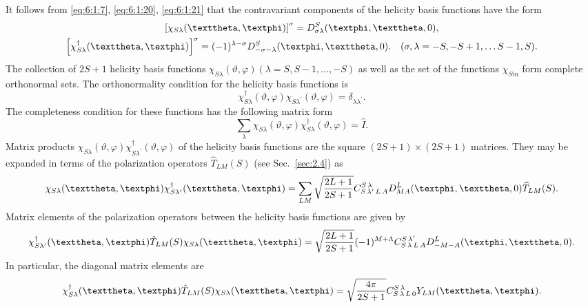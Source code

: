 It follows from \eqref{eq:6:1:7}, \eqref{eq:6:1:20}, \eqref{eq:6:1:21} that the contravariant components of the helicity basis functions have the form
\begin{gather}
{\left[\chi_{S \lambda}(\vartheta, \varphi)\right]^{\sigma}=D_{\sigma \lambda}^{S}(\varphi, \vartheta, 0)}, \notag\\
{\left[\chi_{S \lambda}^{\dagger}(\vartheta, \varphi)\right]^{\sigma}=(-1)^{\lambda-\sigma} D_{-\sigma-\lambda}^{S}(\varphi, \vartheta, 0) . \quad(\sigma, \lambda=-S,-S+1, \ldots S-1, S)}. \label{eq:6:1:22}
\end{gather}
The collection of $2 S+1$ helicity basis functions $\chi_{S \lambda}(\vartheta, \varphi)(\lambda=S, S-1, \ldots,-S)$ as well as the set of the functions $\chi_{S m}$ form complete orthonormal sets. The orthonormality condition for the helicity basis functions is
\begin{equation}
\chi_{S \lambda}^{\dagger}(\vartheta, \varphi) \chi_{S \lambda^{\prime}}(\vartheta, \varphi)=\delta_{\lambda \lambda^{\prime}}. \label{eq:6:1:23}
\end{equation}
The completeness condition for these functions has the following matrix form
\begin{equation}
\sum_{\lambda} \chi_{S \lambda}(\vartheta, \varphi) \chi_{S \lambda}^{\dagger}(\vartheta, \varphi)=\hat{I} . \label{eq:6:1:24}
\end{equation}
Matrix products $\chi_{S \lambda}(\vartheta, \varphi) \chi_{S \lambda^{\prime}}^{\dagger}(\vartheta, \varphi)$ of the helicity basis functions are the square $(2 S+1) \times(2 S+1)$ matrices. They may be expanded in terms of the polarization operators $\widehat{T}_{L M}(S)$ (see Sec.~\ref{sec:2.4}) as
\begin{equation}
\chi_{S \lambda}(\vartheta, \varphi) \chi_{S \lambda^{\prime}}^{\dagger}(\vartheta, \varphi)=\sum_{L M} \sqrt{\frac{2 L+1}{2 S+1}} \clebsch{S}{\lambda^{\prime}}{L}{A}{S}{\lambda} D_{M A}^{L}(\varphi, \vartheta, 0) \widehat{T}_{L M}(S). \label{eq:6:1:25}
\end{equation}
Matrix elements of the polarization operators between the helicity basis functions are given by
\begin{equation}
\chi_{S \lambda^{\prime}}^{\dagger}(\vartheta, \varphi) \hat{T}_{L M}(S) \chi_{S \lambda}(\vartheta, \varphi)=\sqrt{\frac{2 L+1}{2 S+1}}(-1)^{M+\Lambda} \clebsch{S}{\lambda}{L}{A}{S}{\lambda^{\prime}} D_{-M-A}^{L}(\varphi, \vartheta, 0). \label{eq:6:1:26}
\end{equation}
In particular, the diagonal matrix elements are
\begin{equation}
\chi_{S \lambda}^{\dagger}(\vartheta, \varphi) \hat{T}_{L M}(S) \chi_{S \lambda}(\vartheta, \varphi)=\sqrt{\frac{4 \pi}{2 S+1}} \clebsch{S}{\lambda}{L}{0}{S}{\lambda} Y_{L M}(\vartheta, \varphi) . \label{eq:6:1:27}
\end{equation}
